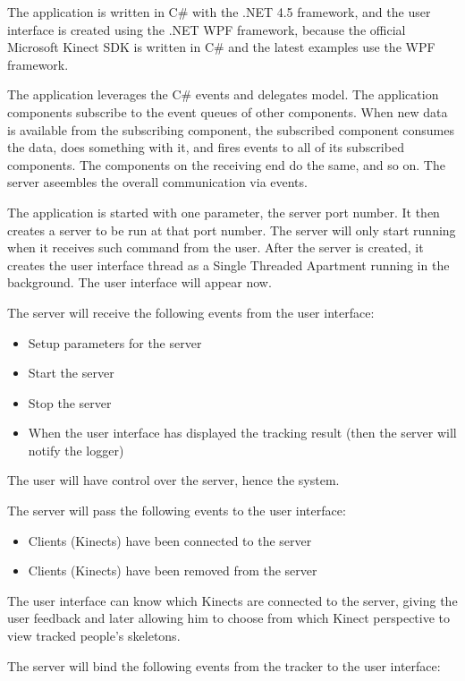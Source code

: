 \documentclass{sigchi}
\begin{document}
The application is written in C\# with the .NET 4.5 framework, and the user interface is created using the .NET WPF framework, because the official Microsoft Kinect SDK is written in C\# and the latest examples use the WPF framework. 

The application leverages the C\# events and delegates model. The application components subscribe to the event queues of other components. When new data is available from the subscribing component, the subscribed component consumes the data, does something with it, and fires events to all of its subscribed components. The components on the receiving end do the same, and so on. The server aseembles the overall communication via events.

The application is started with one parameter, the server port number. It then creates a server to be run at that port number. The server will only start running when it receives such command from the user. After the server is created, it creates the user interface thread as a Single Threaded Apartment running in the background. The user interface will appear now.

The server will receive the following events from the user interface:

\begin{itemize}
  \item Setup parameters for the server
  \item Start the server
  \item Stop the server
  \item When the user interface has displayed the tracking result (then the server will notify the logger)
\end{itemize}

The user will have control over the server, hence the system.

The server will pass the following events to the user interface:

\begin{itemize}
  \item Clients (Kinects) have been connected to the server
  \item Clients (Kinects) have been removed from the server
\end{itemize}

The user interface can know which Kinects are connected to the server, giving the user feedback and later allowing him to choose from which Kinect perspective to view tracked people's skeletons.

The server will bind the following events from the tracker to the user interface:
\end{document}
